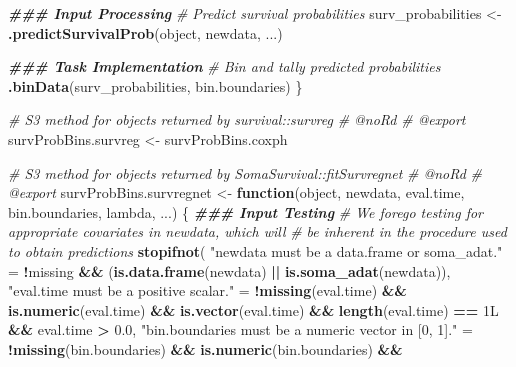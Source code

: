 \documentclass[
]{book}
\newenvironment{Shaded}{\begin{snugshade}}{\end{snugshade}}
\newcommand{\CommentTok}[1]{\textcolor[rgb]{0.56,0.35,0.01}{\textit{#1}}}
\newcommand{\ControlFlowTok}[1]{\textcolor[rgb]{0.13,0.29,0.53}{\textbf{#1}}}
\newcommand{\DocumentationTok}[1]{\textcolor[rgb]{0.56,0.35,0.01}{\textbf{\textit{#1}}}}
\newcommand{\FloatTok}[1]{\textcolor[rgb]{0.00,0.00,0.81}{#1}}
\newcommand{\FunctionTok}[1]{\textcolor[rgb]{0.13,0.29,0.53}{\textbf{#1}}}
\newcommand{\NormalTok}[1]{#1}
\newcommand{\OtherTok}[1]{\textcolor[rgb]{0.56,0.35,0.01}{#1}}
\newcommand{\SpecialCharTok}[1]{\textcolor[rgb]{0.81,0.36,0.00}{\textbf{#1}}}
\newcommand{\StringTok}[1]{\textcolor[rgb]{0.31,0.60,0.02}{#1}}
\begin{document}
\begin{Shaded}
\begin{Highlighting}[]
  \DocumentationTok{\#\#\# Input Processing}
  \CommentTok{\# Predict survival probabilities}
\NormalTok{  surv\_probabilities }\OtherTok{\textless{}{-}} \FunctionTok{.predictSurvivalProb}\NormalTok{(object, newdata, ...)}
  
  \DocumentationTok{\#\#\# Task Implementation}
  \CommentTok{\# Bin and tally predicted probabilities}
  \FunctionTok{.binData}\NormalTok{(surv\_probabilities, bin.boundaries)}
\NormalTok{\}}

\CommentTok{\#\textquotesingle{} S3 method for objects returned by \textasciigrave{}survival::survreg\textasciigrave{}}
\CommentTok{\#\textquotesingle{} @noRd}
\CommentTok{\#\textquotesingle{} @export}
\NormalTok{survProbBins.survreg }\OtherTok{\textless{}{-}}\NormalTok{ survProbBins.coxph}

\CommentTok{\#\textquotesingle{} S3 method for objects returned by \textasciigrave{}SomaSurvival::fitSurvregnet\textasciigrave{}}
\CommentTok{\#\textquotesingle{} @noRd}
\CommentTok{\#\textquotesingle{} @export}
\NormalTok{survProbBins.survregnet }\OtherTok{\textless{}{-}} \ControlFlowTok{function}\NormalTok{(object, newdata, eval.time, bin.boundaries,}
\NormalTok{                                    lambda, ...) \{}
  \DocumentationTok{\#\#\# Input Testing}
  \CommentTok{\# We forego testing for appropriate covariates in \textasciigrave{}newdata\textasciigrave{}, which will}
  \CommentTok{\#   be inherent in the procedure used to obtain predictions}
  \FunctionTok{stopifnot}\NormalTok{(}
    \StringTok{"\textasciigrave{}newdata\textasciigrave{} must be a data.frame or soma\_adat."} \OtherTok{=} 
      \SpecialCharTok{!}\NormalTok{missing }\SpecialCharTok{\&\&}\NormalTok{ (}\FunctionTok{is.data.frame}\NormalTok{(newdata) }\SpecialCharTok{||} \FunctionTok{is.soma\_adat}\NormalTok{(newdata)),}
    \StringTok{"\textasciigrave{}eval.time\textasciigrave{} must be a positive scalar."} \OtherTok{=} 
      \SpecialCharTok{!}\FunctionTok{missing}\NormalTok{(eval.time) }\SpecialCharTok{\&\&} \FunctionTok{is.numeric}\NormalTok{(eval.time) }\SpecialCharTok{\&\&} 
        \FunctionTok{is.vector}\NormalTok{(eval.time) }\SpecialCharTok{\&\&} \FunctionTok{length}\NormalTok{(eval.time) }\SpecialCharTok{==}\NormalTok{ 1L }\SpecialCharTok{\&\&}\NormalTok{ eval.time }\SpecialCharTok{\textgreater{}} \FloatTok{0.0}\NormalTok{,}
    \StringTok{"\textasciigrave{}bin.boundaries\textasciigrave{} must be a numeric vector in [0, 1]."} \OtherTok{=} 
      \SpecialCharTok{!}\FunctionTok{missing}\NormalTok{(bin.boundaries) }\SpecialCharTok{\&\&} \FunctionTok{is.numeric}\NormalTok{(bin.boundaries) }\SpecialCharTok{\&\&} 

\end{Highlighting}
\end{Shaded}
\end{document}
